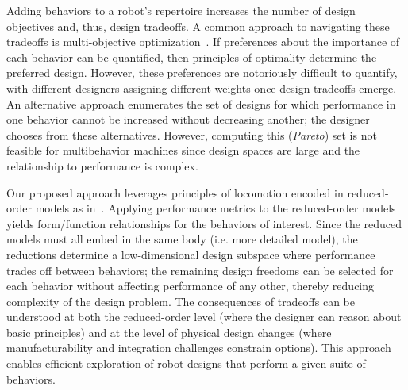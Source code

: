 \documentclass[11pt]{article}
\begin{document}
Adding behaviors to a robot's repertoire increases the number of design objectives and, thus, design tradeoffs. 
A common approach to navigating these tradeoffs is multi-objective optimization~. 
If preferences about the importance of each behavior can be quantified, then principles of optimality determine the preferred design. 
However, these preferences are notoriously difficult to quantify, with different designers assigning different weights once design tradeoffs emerge. 
An alternative approach enumerates the set of  designs for which performance in one behavior cannot be increased without decreasing another; the designer chooses from these alternatives. 
However, computing this (\emph{Pareto}) set is not feasible for multibehavior machines since design spaces are large and the relationship to performance is complex.


Our proposed approach leverages principles of locomotion encoded in reduced-order models as in~. 
Applying performance metrics to the reduced-order models yields form/function relationships for the behaviors of interest. 
Since the reduced models must all embed in the same body (i.e. more detailed model), the reductions determine a low-dimensional design subspace where performance trades off between behaviors; 
the remaining design freedoms can be selected for each behavior without affecting performance of any other, thereby reducing complexity of the design problem. 
The consequences of tradeoffs can be understood at both the reduced-order level (where the designer can reason about basic principles) and at the level of physical design changes (where manufacturability and integration challenges constrain options). 
This approach enables efficient exploration of robot designs that perform a given suite of behaviors.
\end{document}
